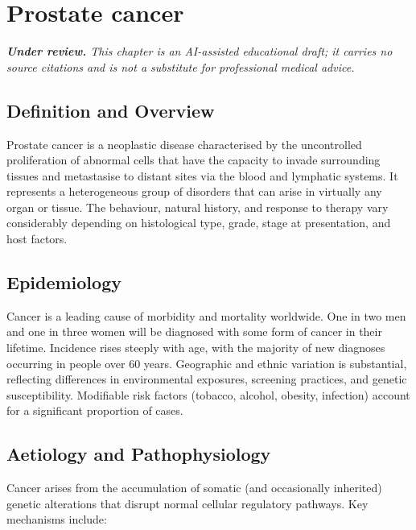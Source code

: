 \chapter{Prostate cancer}

\medskip
\noindent\textit{\textbf{Under review.} This chapter is an AI-assisted educational draft; it carries no source citations and is not a substitute for professional medical advice.}

\section*{Definition and Overview}
Prostate cancer is a neoplastic disease characterised by the uncontrolled proliferation of abnormal cells that have the capacity to invade surrounding tissues and metastasise to distant sites via the blood and lymphatic systems. It represents a heterogeneous group of disorders that can arise in virtually any organ or tissue. The behaviour, natural history, and response to therapy vary considerably depending on histological type, grade, stage at presentation, and host factors.

\section*{Epidemiology}
Cancer is a leading cause of morbidity and mortality worldwide. One in two men and one in three women will be diagnosed with some form of cancer in their lifetime. Incidence rises steeply with age, with the majority of new diagnoses occurring in people over 60 years. Geographic and ethnic variation is substantial, reflecting differences in environmental exposures, screening practices, and genetic susceptibility. Modifiable risk factors (tobacco, alcohol, obesity, infection) account for a significant proportion of cases.

\section*{Aetiology and Pathophysiology}
Cancer arises from the accumulation of somatic (and occasionally inherited) genetic alterations that disrupt normal cellular regulatory pathways. Key mechanisms include:

